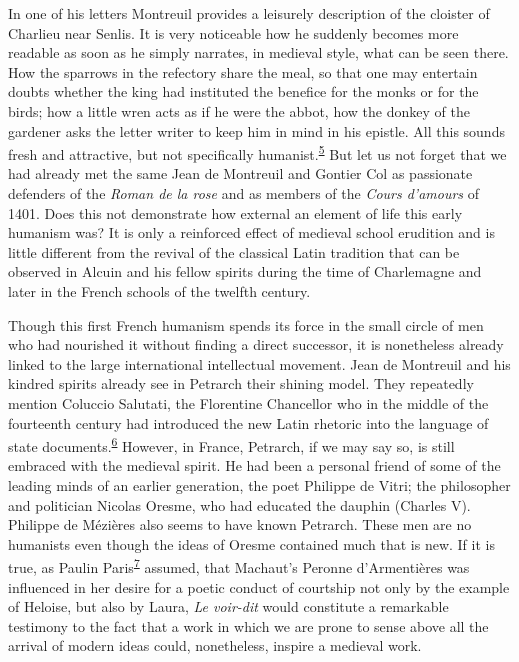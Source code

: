 In one of his letters Montreuil provides a leisurely description of the
cloister of Charlieu near Senlis. It is very noticeable how he suddenly
becomes more readable as soon as he simply narrates, in medieval style,
what can be seen there. How the sparrows in the refectory share the
meal, so that one may entertain doubts whether the king had instituted
the benefice for the monks or for the birds; how a little wren acts as
if he were the abbot, how the donkey of the gardener asks the letter
writer to keep him in mind in his epistle. All this sounds fresh and
attractive, but not specifically
humanist.\textsuperscript{\protect\hypertarget{22_Chapter_Fourteen__THE_COMING_OF.xhtmlux5cux23id_114}{\protect\hyperlink{23_NOTES.xhtmlux5cux23id_115}{5}}}
But let us not forget that we had already met the same Jean de Montreuil
and Gontier Col as passionate defenders of the \emph{Roman de la rose}
and as members of the \emph{Cours d'amours} of 1401. Does this not
demonstrate how external an element of life this early humanism was? It
is only a reinforced effect of medieval school erudition and is little
different from the revival of the classical Latin tradition that can be
observed in Alcuin and his fellow spirits during the time of Charlemagne
and later in the French schools of the twelfth century.

Though this first French humanism spends its force in the small circle
of men who had nourished it without finding a direct successor, it is
nonetheless already linked to the large international intellectual
movement. Jean de Montreuil and his kindred spirits already see in
Petrarch their shining model. They repeatedly mention Coluccio Salutati,
the Florentine Chancellor who in the middle of the fourteenth century
had introduced the new Latin rhetoric into the language of state
documents.\textsuperscript{\protect\hypertarget{22_Chapter_Fourteen__THE_COMING_OF.xhtmlux5cux23id_112}{\protect\hyperlink{23_NOTES.xhtmlux5cux23id_113}{6}}}
However, in France, Petrarch, if we may say so, is still embraced with
the medieval spirit. He had been a personal friend of some of the
leading minds of an earlier generation, the poet Philippe de Vitri; the
philosopher and politician Nicolas Oresme, who had educated the dauphin
(Charles V). Philippe de Mézières also seems to have known Petrarch.
These men are no humanists even though the ideas of Oresme contained
much that is new. If it is true, as Paulin
Paris\textsuperscript{\protect\hypertarget{22_Chapter_Fourteen__THE_COMING_OF.xhtmlux5cux23id_110}{\protect\hyperlink{23_NOTES.xhtmlux5cux23id_111}{7}}}
assumed, that Machaut's Peronne d'Armentières was influenced in her
desire for a poetic conduct of courtship not only by the example of
Heloise, but also by Laura, \emph{Le voir-dit} would constitute a
remarkable testimony to the fact that a work in which we are prone to
sense above all the arrival of modern ideas could, nonetheless, inspire
a medieval work.

